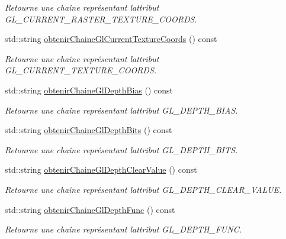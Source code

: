 \begin{DoxyCompactItemize}
\begin{DoxyCompactList}\small\item\em Retourne une chaîne représentant l\textquotesingle{}attribut G\+L\+\_\+\+C\+U\+R\+R\+E\+N\+T\+\_\+\+R\+A\+S\+T\+E\+R\+\_\+\+T\+E\+X\+T\+U\+R\+E\+\_\+\+C\+O\+O\+R\+D\+S. \end{DoxyCompactList}\item 
std\+::string \hyperlink{group__utilitaire_ga5bf6abadfe9d63e576d34c94c93ee8f0}{obtenir\+Chaine\+Gl\+Current\+Texture\+Coords} () const 
\begin{DoxyCompactList}\small\item\em Retourne une chaîne représentant l\textquotesingle{}attribut G\+L\+\_\+\+C\+U\+R\+R\+E\+N\+T\+\_\+\+T\+E\+X\+T\+U\+R\+E\+\_\+\+C\+O\+O\+R\+D\+S. \end{DoxyCompactList}\item 
std\+::string \hyperlink{group__utilitaire_gae3e587b7e9f860f3874823a3c4ab7d71}{obtenir\+Chaine\+Gl\+Depth\+Bias} () const 
\begin{DoxyCompactList}\small\item\em Retourne une chaîne représentant l\textquotesingle{}attribut G\+L\+\_\+\+D\+E\+P\+T\+H\+\_\+\+B\+I\+A\+S. \end{DoxyCompactList}\item 
std\+::string \hyperlink{group__utilitaire_gae1dffc44c8e27d7cb249064cfe35653e}{obtenir\+Chaine\+Gl\+Depth\+Bits} () const 
\begin{DoxyCompactList}\small\item\em Retourne une chaîne représentant l\textquotesingle{}attribut G\+L\+\_\+\+D\+E\+P\+T\+H\+\_\+\+B\+I\+T\+S. \end{DoxyCompactList}\item 
std\+::string \hyperlink{group__utilitaire_gad8b3e2701fb07b0178b5015868818509}{obtenir\+Chaine\+Gl\+Depth\+Clear\+Value} () const 
\begin{DoxyCompactList}\small\item\em Retourne une chaîne représentant l\textquotesingle{}attribut G\+L\+\_\+\+D\+E\+P\+T\+H\+\_\+\+C\+L\+E\+A\+R\+\_\+\+V\+A\+L\+U\+E. \end{DoxyCompactList}\item 
std\+::string \hyperlink{group__utilitaire_gac0dff9e4aee8f969fe6e688bb407dcc9}{obtenir\+Chaine\+Gl\+Depth\+Func} () const 
\begin{DoxyCompactList}\small\item\em Retourne une chaîne représentant l\textquotesingle{}attribut G\+L\+\_\+\+D\+E\+P\+T\+H\+\_\+\+F\+U\+N\+C. \end{DoxyCompactList}\item 

\end{DoxyCompactItemize}
